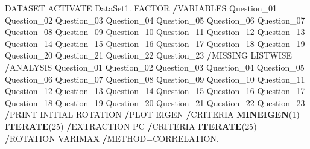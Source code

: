 \documentclass[
]{book}
\newenvironment{Shaded}{\begin{snugshade}}{\end{snugshade}}
\newcommand{\DecValTok}[1]{\textcolor[rgb]{0.00,0.00,0.81}{#1}}
\newcommand{\KeywordTok}[1]{\textcolor[rgb]{0.13,0.29,0.53}{\textbf{#1}}}
\newcommand{\NormalTok}[1]{#1}
\newcommand{\OperatorTok}[1]{\textcolor[rgb]{0.81,0.36,0.00}{\textbf{#1}}}
\begin{document}
\begin{Shaded}
\begin{Highlighting}[]
\NormalTok{DATASET ACTIVATE DataSet1.}
\NormalTok{FACTOR}
  \OperatorTok{/}\NormalTok{VARIABLES Question_}\DecValTok{01}\NormalTok{ Question_}\DecValTok{02}\NormalTok{ Question_}\DecValTok{03}\NormalTok{ Question_}\DecValTok{04}\NormalTok{ Question_}\DecValTok{05}\NormalTok{ Question_}\DecValTok{06}\NormalTok{ Question_}\DecValTok{07} 
\NormalTok{    Question_}\DecValTok{08}\NormalTok{ Question_}\DecValTok{09}\NormalTok{ Question_}\DecValTok{10}\NormalTok{ Question_}\DecValTok{11}\NormalTok{ Question_}\DecValTok{12}\NormalTok{ Question_}\DecValTok{13}\NormalTok{ Question_}\DecValTok{14}\NormalTok{ Question_}\DecValTok{15} 
\NormalTok{    Question_}\DecValTok{16}\NormalTok{ Question_}\DecValTok{17}\NormalTok{ Question_}\DecValTok{18}\NormalTok{ Question_}\DecValTok{19}\NormalTok{ Question_}\DecValTok{20}\NormalTok{ Question_}\DecValTok{21}\NormalTok{ Question_}\DecValTok{22}\NormalTok{ Question_}\DecValTok{23}
  \OperatorTok{/}\NormalTok{MISSING LISTWISE }
  \OperatorTok{/}\NormalTok{ANALYSIS Question_}\DecValTok{01}\NormalTok{ Question_}\DecValTok{02}\NormalTok{ Question_}\DecValTok{03}\NormalTok{ Question_}\DecValTok{04}\NormalTok{ Question_}\DecValTok{05}\NormalTok{ Question_}\DecValTok{06}\NormalTok{ Question_}\DecValTok{07} 
\NormalTok{    Question_}\DecValTok{08}\NormalTok{ Question_}\DecValTok{09}\NormalTok{ Question_}\DecValTok{10}\NormalTok{ Question_}\DecValTok{11}\NormalTok{ Question_}\DecValTok{12}\NormalTok{ Question_}\DecValTok{13}\NormalTok{ Question_}\DecValTok{14}\NormalTok{ Question_}\DecValTok{15} 
\NormalTok{    Question_}\DecValTok{16}\NormalTok{ Question_}\DecValTok{17}\NormalTok{ Question_}\DecValTok{18}\NormalTok{ Question_}\DecValTok{19}\NormalTok{ Question_}\DecValTok{20}\NormalTok{ Question_}\DecValTok{21}\NormalTok{ Question_}\DecValTok{22}\NormalTok{ Question_}\DecValTok{23}
  \OperatorTok{/}\NormalTok{PRINT INITIAL ROTATION}
  \OperatorTok{/}\NormalTok{PLOT EIGEN}
  \OperatorTok{/}\NormalTok{CRITERIA }\KeywordTok{MINEIGEN}\NormalTok{(}\DecValTok{1}\NormalTok{) }\KeywordTok{ITERATE}\NormalTok{(}\DecValTok{25}\NormalTok{)}
  \OperatorTok{/}\NormalTok{EXTRACTION PC}
  \OperatorTok{/}\NormalTok{CRITERIA }\KeywordTok{ITERATE}\NormalTok{(}\DecValTok{25}\NormalTok{)}
  \OperatorTok{/}\NormalTok{ROTATION VARIMAX}
  \OperatorTok{/}\NormalTok{METHOD=CORRELATION.}
\end{Highlighting}
\end{Shaded}
\end{document}
